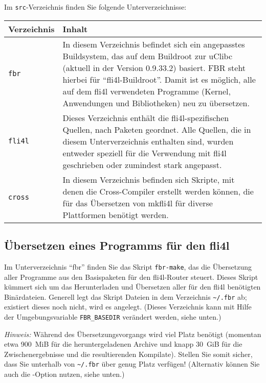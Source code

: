 Im \texttt{src}-Verzeichnis finden Sie folgende Unterverzeichnisse:

\begin{longtable}{|l|p{10cm}|}
    \hline
    \multicolumn{1}{|l}{\textbf{Verzeichnis}} &
    \multicolumn{1}{|l|}{\textbf{Inhalt}} \\
    \hline
    \endhead
    \hline
    \endfoot
    \endlastfoot
\texttt{fbr} &
    In diesem Verzeichnis befindet sich ein angepasstes Buildsystem, das auf
    dem Buildroot zur uClibc (aktuell in der Version 0.9.33.2) basiert.
    FBR steht hierbei für ``fli4l-Buildroot''. Damit ist es möglich, alle auf
    dem fli4l verwendeten Programme (Kernel, Anwendungen und Bibliotheken) neu
    zu übersetzen. \\
\hline
\texttt{fli4l} &
    Dieses Verzeichnis enthält die fli4l-spezifischen Quellen, nach Paketen
    geordnet. Alle Quellen, die in diesem Unterverzeichnis enthalten sind,
    wurden entweder speziell für die Verwendung mit fli4l geschrieben oder
    zumindest stark angepasst. \\
\hline
\texttt{cross} &
    In diesem Verzeichnis befinden sich Skripte, mit denen die Cross-Compiler
    erstellt werden können, die für das Übersetzen von mkfli4l für diverse
    Plattformen benötigt werden. \\
\hline
\end{longtable}

\subsection{Übersetzen eines Programms für den fli4l}

Im Unterverzeichnis ``fbr'' finden Sie das Skript \texttt{fbr-make}, das die
Übersetzung aller Programme aus den Basispaketen für den fli4l-Router
steuert. Dieses Skript kümmert sich um das Herunterladen und Übersetzen aller
für den fli4l benötigten Binärdateien. Generell legt das Skript Dateien in dem
Verzeichnis \texttt{\~{}/.fbr} ab; existiert dieses noch nicht, wird es
angelegt. (Dieses Verzeichnis kann mit Hilfe der Umgebungsvariable
\texttt{FBR\_BASEDIR} verändert werden, siehe unten.)

\emph{Hinweis:} Während des Übersetzungsvorgangs wird viel Platz benötigt
(momentan etwa 900~MiB für die heruntergeladenen Archive und knapp 30~GiB
für die Zwischenergebnisse und die resultierenden Kompilate). Stellen Sie somit
sicher, dass Sie unterhalb von \texttt{\~{}/.fbr} über genug Platz verfügen!
(Alternativ können Sie auch die -Option nutzen, siehe unten.)

